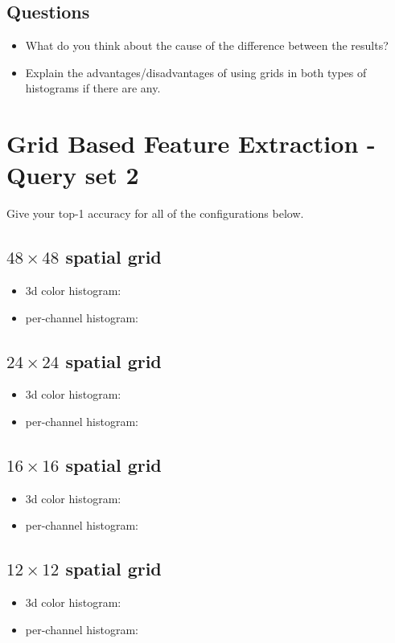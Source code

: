 \documentclass[12pt]{article}
\begin{document}
\subsection{Questions}
\begin{itemize}
\item What do you think about the cause of the difference between the results?
\item Explain the advantages/disadvantages of using grids in both types of histograms if there are any.
\end{itemize}

\section{Grid Based Feature Extraction - Query set 2}
Give your top-1 accuracy for all of the configurations below.

\subsection{$48\times48$ spatial grid}
\begin{itemize}
\item 3d color histogram:
\item per-channel histogram:
\end{itemize}

\subsection{$24\times24$ spatial grid}
\begin{itemize}
\item 3d color histogram:
\item per-channel histogram:
\end{itemize}

\subsection{$16\times16$ spatial grid}
\begin{itemize}
\item 3d color histogram:
\item per-channel histogram:
\end{itemize}

\subsection{$12\times12$ spatial grid}
\begin{itemize}
\item 3d color histogram:
\item per-channel histogram:
\end{itemize}
\end{document}
